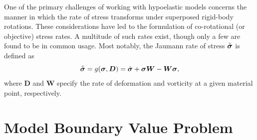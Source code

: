 One of the primary challenges of working with hypoelastic models concerns the manner in which the rate of stress transforms under superposed rigid-body rotations. These considerations have led to the formulation of co-rotational (or objective) stress rates. A multitude of such rates exist, though only a few are found to be in common usage. Most notably, the Jaumann rate of stress $\accentset{\circ}{\boldsymbol{\sigma}}$ is defined as
\begin{equation}
  \accentset{\circ}{\boldsymbol{\sigma}} = g (\boldsymbol{\sigma}, \bm{D}) = \dot{\boldsymbol{\sigma}} + \boldsymbol{\sigma} \bm{W} - \bm{W} \boldsymbol{\sigma},
\end{equation}
where $\bm{D}$ and $\bm{W}$ specify the rate of deformation and vorticity at a given material point, respectively.

%
%
%

\section{Model Boundary Value Problem}

